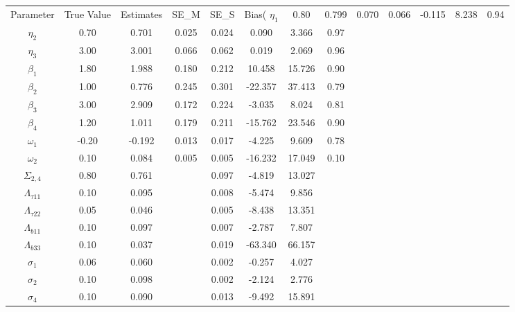 \begin{table}[ht]
\centering
\begin{tabular}{cccccccc}
  \hline
Parameter & True Value & Estimates & SE_M & SE_S & Bias(%
  \hline
\hline
$\eta_1$ & 0.80 & 0.799 & 0.070 & 0.066 & -0.115 & 8.238 & 0.94 \\ 
  $\eta_2$ & 0.70 & 0.701 & 0.025 & 0.024 & 0.090 & 3.366 & 0.97 \\ 
  $\eta_3$ & 3.00 & 3.001 & 0.066 & 0.062 & 0.019 & 2.069 & 0.96 \\ 
  $\beta_1$ & 1.80 & 1.988 & 0.180 & 0.212 & 10.458 & 15.726 & 0.90 \\ 
  $\beta_2$ & 1.00 & 0.776 & 0.245 & 0.301 & -22.357 & 37.413 & 0.79 \\ 
  $\beta_3$ & 3.00 & 2.909 & 0.172 & 0.224 & -3.035 & 8.024 & 0.81 \\ 
  $\beta_4$ & 1.20 & 1.011 & 0.179 & 0.211 & -15.762 & 23.546 & 0.90 \\ 
  $\omega_1$ & -0.20 & -0.192 & 0.013 & 0.017 & -4.225 & 9.609 & 0.78 \\ 
  $\omega_2$ & 0.10 & 0.084 & 0.005 & 0.005 & -16.232 & 17.049 & 0.10 \\ 
   \hline
$\Sigma_{2,4}$ & 0.80 & 0.761 &  & 0.097 & -4.819 & 13.027 &  \\ 
  $\Lambda_{\tau11}$ & 0.10 & 0.095 &  & 0.008 & -5.474 & 9.856 &  \\ 
  $\Lambda_{\tau22}$ & 0.05 & 0.046 &  & 0.005 & -8.438 & 13.351 &  \\ 
  $\Lambda_{b11}$ & 0.10 & 0.097 &  & 0.007 & -2.787 & 7.807 &  \\ 
  $\Lambda_{b33}$ & 0.10 & 0.037 &  & 0.019 & -63.340 & 66.157 &  \\ 
  $\sigma_1$ & 0.06 & 0.060 &  & 0.002 & -0.257 & 4.027 &  \\ 
  $\sigma_2$ & 0.10 & 0.098 &  & 0.002 & -2.124 & 2.776 &  \\ 
  $\sigma_4$ & 0.10 & 0.090 &  & 0.013 & -9.492 & 15.891 &  \\ 
  \end{tabular}
\end{table}

